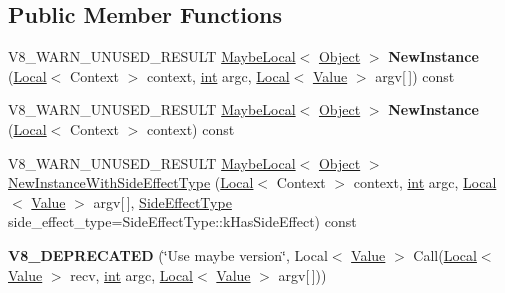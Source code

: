 \subsection*{Public Member Functions}
\begin{DoxyCompactItemize}
\item 
\mbox{\label{classv8_1_1Function_ad9d54477a970ec3bb4a6ea69a58735de}} 
V8\+\_\+\+W\+A\+R\+N\+\_\+\+U\+N\+U\+S\+E\+D\+\_\+\+R\+E\+S\+U\+LT \mbox{\hyperlink{classv8_1_1MaybeLocal}{Maybe\+Local}}$<$ \mbox{\hyperlink{classv8_1_1Object}{Object}} $>$ {\bfseries New\+Instance} (\mbox{\hyperlink{classv8_1_1Local}{Local}}$<$ Context $>$ context, \mbox{\hyperlink{classint}{int}} argc, \mbox{\hyperlink{classv8_1_1Local}{Local}}$<$ \mbox{\hyperlink{classv8_1_1Value}{Value}} $>$ argv\mbox{[}$\,$\mbox{]}) const
\item 
\mbox{\label{classv8_1_1Function_ab491afc6bdf1d5174fe55d5cfad4ffe9}} 
V8\+\_\+\+W\+A\+R\+N\+\_\+\+U\+N\+U\+S\+E\+D\+\_\+\+R\+E\+S\+U\+LT \mbox{\hyperlink{classv8_1_1MaybeLocal}{Maybe\+Local}}$<$ \mbox{\hyperlink{classv8_1_1Object}{Object}} $>$ {\bfseries New\+Instance} (\mbox{\hyperlink{classv8_1_1Local}{Local}}$<$ Context $>$ context) const
\item 
V8\+\_\+\+W\+A\+R\+N\+\_\+\+U\+N\+U\+S\+E\+D\+\_\+\+R\+E\+S\+U\+LT \mbox{\hyperlink{classv8_1_1MaybeLocal}{Maybe\+Local}}$<$ \mbox{\hyperlink{classv8_1_1Object}{Object}} $>$ \mbox{\hyperlink{classv8_1_1Function_afe9f17d00c8da825b774f02b70d395a2}{New\+Instance\+With\+Side\+Effect\+Type}} (\mbox{\hyperlink{classv8_1_1Local}{Local}}$<$ Context $>$ context, \mbox{\hyperlink{classint}{int}} argc, \mbox{\hyperlink{classv8_1_1Local}{Local}}$<$ \mbox{\hyperlink{classv8_1_1Value}{Value}} $>$ argv\mbox{[}$\,$\mbox{]}, \mbox{\hyperlink{namespacev8_a29711319c2b9fc7716d65faee2f7b9cb}{Side\+Effect\+Type}} side\+\_\+effect\+\_\+type=Side\+Effect\+Type\+::k\+Has\+Side\+Effect) const
\item 
\mbox{\label{classv8_1_1Function_a8d450b17b9bb911860ecf6c51ad468c0}} 
{\bfseries V8\+\_\+\+D\+E\+P\+R\+E\+C\+A\+T\+ED} (\char`\"{}Use maybe version\char`\"{}, Local$<$ \mbox{\hyperlink{classv8_1_1Value}{Value}} $>$ Call(\mbox{\hyperlink{classv8_1_1Local}{Local}}$<$ \mbox{\hyperlink{classv8_1_1Value}{Value}} $>$ recv, \mbox{\hyperlink{classint}{int}} argc, \mbox{\hyperlink{classv8_1_1Local}{Local}}$<$ \mbox{\hyperlink{classv8_1_1Value}{Value}} $>$ argv\mbox{[}$\,$\mbox{]}))

\end{DoxyCompactItemize}
